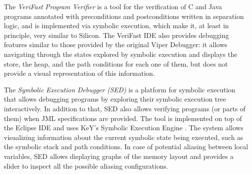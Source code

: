 

The \emph{VeriFast Program Verifier} \citep{verifast} is a tool for the
verification of C and Java programs annotated with preconditions and
postconditions written in separation logic, and is implemented via symbolic
execution, which make it, at least in principle, very similar to Silicon. The
VeriFast IDE also provides debugging features similar to those provided by the
original Viper Debugger: it allows navigating through the states explored by
symbolic execution and displays the store, the heap, and the path conditions for
each one of them, but does not provide a visual representation of this
information.

The \emph{Symbolic Execution Debugger (SED)} \citep{sed} is a platform for
symbolic execution that allows debugging programs by exploring their symbolic
execution tree interactively. In addition to that, SED also allows verifying
programs (or parts of them) when JML\citep{jml} specifications are provided.
The tool is implemented on top of the Eclipse IDE and uses KeY's Symbolic
Execution Engine \citep{KeY}. The system allows visualizing information about
the current symbolic state being executed, such as the symbolic stack and path
conditions. In case of potential aliasing between local variables, SED allows
displaying graphs of the memory layout and provides a slider to inspect all the
possible aliasing configurations.

